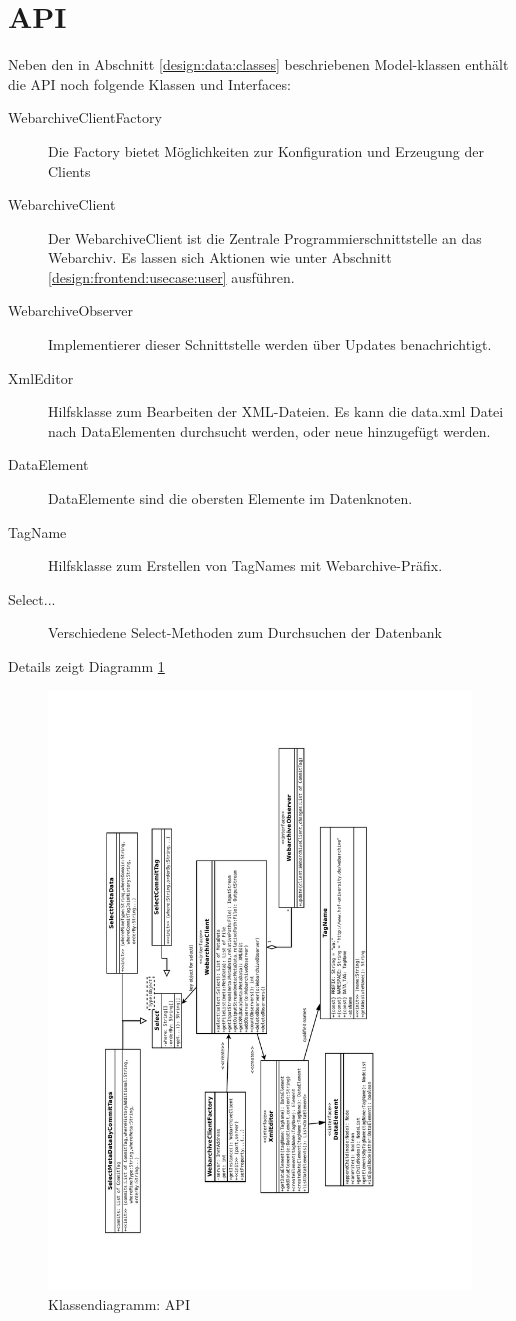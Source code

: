 \section{API}
\liable{\cii}
Neben den in Abschnitt \ref{design:data:classes} beschriebenen Model-klassen enthält die
API noch folgende Klassen und Interfaces:
\begin{description}
	\item [WebarchiveClientFactory]
		Die Factory bietet Möglichkeiten zur Konfiguration und Erzeugung der Clients
	\item [WebarchiveClient]
		Der WebarchiveClient ist die Zentrale Programmierschnittstelle an das Webarchiv.
		Es lassen sich Aktionen wie unter Abschnitt \ref{design:frontend:usecase:user} ausführen.
	\item [WebarchiveObserver]
		Implementierer dieser Schnittstelle werden über Updates benachrichtigt.
	\item [XmlEditor]
		Hilfsklasse zum Bearbeiten der XML-Dateien. Es kann die data.xml Datei nach
		DataElementen durchsucht werden, oder neue hinzugefügt werden.
	\item [DataElement]
		DataElemente sind die obersten Elemente im Datenknoten.
	\item [TagName]
		Hilfsklasse zum Erstellen von TagNames mit Webarchive-Präfix.
	\item [Select...]
		Verschiedene Select-Methoden zum Durchsuchen der Datenbank

\end{description}
Details zeigt Diagramm \ref{dia:design:frontend:cl:api}
\begin{figure}[H]
	\centering
	\label{dia:design:frontend:cl:api}
	\includegraphics[width=.8\textwidth]{design/frontend/classes/api-Klassen.pdf}
	\caption{Klassendiagramm: API}
\end{figure}

